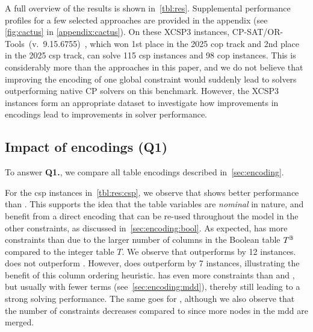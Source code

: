 \documentclass[a4paper,UKenglish,cleveref,autoref,thm-restate]{lipics-v2021}
\begin{document}
A full overview of the results is shown in~\cref{tbl:res}.
Supplemental performance profiles for a few selected approaches are provided in the appendix (see \cref{fig:cactus} in \cref{appendix:cactus}).
On these XCSP3 instances, CP-SAT/OR-Tools~(v.~9.15.6755)~\cite{cpsatlp}, which won 1st place in the 2025 \gls{cop} track and 2nd place in the 2025 \gls{csp} track, can solve 115 \gls{csp} instances and 98 \gls{cop} instances.
This is considerably more than the \milp approaches in this paper, and we do not believe that improving the encoding of one global constraint would suddenly lead to \milp solvers outperforming native CP solvers on this benchmark.
However, the XCSP3 instances form an appropriate dataset to investigate how improvements in encodings lead to improvements in \milp solver performance.

\newcommand{\tableCaption}{
Overview of results.
The reported statuses are \pst for linearizing and posting the model, \sat for finding a feasible solution, or \sol for solved (\ie reported unsatisfiable, or \sat for \glspl{csp}, or optimal for \glspl{cop}), within the time- and memory limit.
We report the average solve time (including encode/post time) over all instances, with a PAR2 penalty for unsolved instances.
We also show the average number of constraints required to encode the instances which were successfully posted by all approaches, and the average number of cuts to solve instances which were solved by all lazy approaches.
The best result for the various columns is shown in \textbf{bold}.
}


\subsection{Impact of encodings (Q1)}

To answer \textbf{Q1.}, we compare all table encodings described in~\cref{sec:encoding}.

For the \gls{csp} instances in~\cref{tbl:res:csp}, we observe that \baseBool shows better performance than \baseGleb.
This supports the idea that the table variables are \textit{nominal} in nature, and benefit from a direct encoding that can be re-used throughout the model in the other constraints, as discussed in~\cref{sec:encoding:bool}.
As expected, \baseBool has more constraints than \baseGleb due to the larger number of columns in the Boolean table $T^{\mathbb{B}}$ compared to the integer table $T$.
We observe that \baseMddInput outperforms \baseGleb by 12 instances.
\baseMddInput does not outperform \baseBool.
However, \baseMddDomIncr does outperform \baseBool by 7 instances, illustrating the benefit of this column ordering heuristic.
\baseMddInput has even more constraints than \baseGleb and \baseBool, but usually with fewer terms (see~\cref{sec:encoding:mdd}), thereby still leading to a strong solving performance.
The same goes for \baseMddDomIncr, although we also observe that the number of constraints decreases compared to \baseMddInput since more nodes in the \gls{mdd} are merged.
\end{document}
